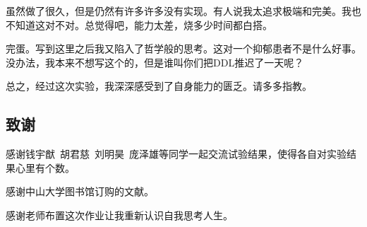 \documentclass[11pt, a4paper]{article}
\begin{document}
虽然做了很久，但是仍然有许多许多没有实现。有人说我太追求极端和完美。我也不知道这对不对。总觉得吧，能力太差，烧多少时间都白搭。

完蛋。写到这里之后我又陷入了哲学般的思考。这对一个抑郁患者不是什么好事。没办法，我本来不想写这个的，但是谁叫你们把DDL推迟了一天呢？

总之，经过这次实验，我深深感受到了自身能力的匮乏。请多多指教。

\subsection{致谢}
感谢钱宇猷\ 胡君慈\ 刘明昊\ 庞泽雄等同学一起交流试验结果，使得各自对实验结果心里有个数。

感谢中山大学图书馆订购的文献。

感谢老师布置这次作业让我重新认识自我思考人生。



\end{document}
